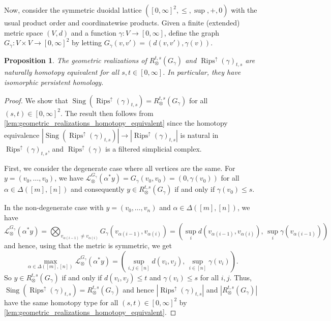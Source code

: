 \documentclass[a4paper,11pt]{article}
\newcommand{\tensor}{\otimes}
\newcommand{\bigtensor}{\bigotimes}
\newcounter{dummy}\numberwithin{dummy}{section}
\newtheorem{proposition}[dummy]{Proposition}
\theoremstyle{remark}
\begin{document}
Now, consider the symmetric duoidal lattice $([0,\infty]^2,\leq,\sup,+,0)$ with the usual product order and coordinatewise products. Given a finite (extended) metric space $(V,d)$ and a function $\gamma\colon V\to[0,\infty]$, define the graph $G_\gamma\colon V\times V\to [0,\infty]^2$ by letting $G_\gamma(v,v')=(d(v,v'),\gamma(v))$. 
\begin{proposition}\label{prop:sublevel_rips_equivalent}
    The geometric realizations of $R^{t,s}_\tensor(G_\gamma)$ and $\operatorname{Rips}^\uparrow(\gamma)_{t,s}$ are naturally homotopy equivalent for all $s,t\in[0,\infty]$. In particular, they have isomorphic persistent homology.
\end{proposition}
\begin{proof}
We show that $\operatorname{Sing}(\operatorname{Rips}^\uparrow(\gamma)_{t,s})=R^{t,s}_\tensor(G_\gamma)$ for all $(s,t)\in[0,\infty]^2$. The result then follows from \cref{lem:geometric_realizations_homotopy_equivalent} since the homotopy equivalence $|\operatorname{Sing}(\operatorname{Rips}^\uparrow(\gamma)_{t,s})|\to |\operatorname{Rips}^\uparrow(\gamma)_{t,s}|$ is natural in $\operatorname{Rips}^\uparrow(\gamma)_{t,s}$, and $\operatorname{Rips}^\uparrow(\gamma)$ is a filtered simplicial complex.

First, we consider the degenerate case where all vertices are the same. For $y=(v_0,\ldots,v_0)$, we have $\mathcal{L}^{G_\gamma}_\tensor(\alpha^*y)=G_\gamma(v_0,v_0)=(0,\gamma(v_0))$ for all $\alpha\in\Delta([m],[n])$ and consequently $y\in R^{t,s}_\otimes(G_\gamma)$ if and only if $\gamma(v_0)\leq s$. 

In the non-degenerate case with $y=(v_0,\ldots,v_n)$ and $\alpha\in\Delta([m],[n])$, we have
\begin{equation*}
\mathcal{L}^{G_\gamma}_\tensor(\alpha^*y) = \bigtensor_{v_{\alpha(i-1)}\neq v_{\alpha(i)}}G_\gamma(v_{\alpha(i-1)}, v_{\alpha(i)})= \left(\sup_i d(v_{\alpha(i-1)}, v_{\alpha(i)}),\, \sup_i\gamma(v_{\alpha(i-1)})\right)
\end{equation*}
and hence, using that the metric is symmetric, we get
\begin{equation*}
\max_{\alpha\in\Delta([m],[n])}\mathcal{L}^{G_\gamma}_\tensor(\alpha^*y)=\left(\sup_{i,j\in[n]}d(v_i,v_j),\, \sup_{i\in[n]}\gamma(v_i)\right).
\end{equation*}
So $y\in R^{t,s}_\otimes(G_\gamma)$ if and only if $d(v_i,v_j)\leq t$ and $\gamma(v_i)\leq s$ for all $i,j$.
Thus, $\operatorname{Sing}(\operatorname{Rips}^\uparrow(\gamma)_{t,s})=R^{t,s}_\tensor(G_\gamma)$ and hence $|\operatorname{Rips}^\uparrow(\gamma)_{t,s}|$ and $|R^{t,s}_\tensor(G_\gamma)|$ have the same homotopy type for all $(s,t)\in[0,\infty]^2$ by \cref{lem:geometric_realizations_homotopy_equivalent}. 
\end{proof}
\end{document}
